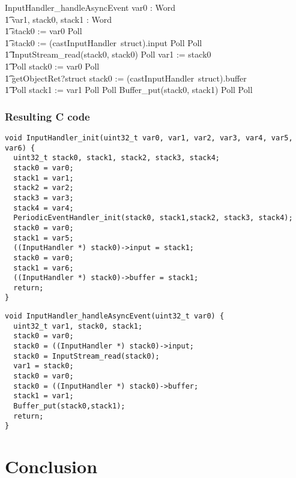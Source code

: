 \documentclass{beamer}
\begin{document}
\begin{frame}[shrink]
\begin{circus}
    InputHandler\_handleAsyncEvent \circdef \circval var0 : Word \circspot \\
    \t1 \circvar var1, stack0, stack1 : Word \circspot \\
    \t1 stack0 := var0 \circseq Poll  \\
    \t1 {\color{red} stack0 := (castInputHandler~struct).input} \circseq Poll \circseq Poll \circseq \\
    \t1 InputStream\_read(stack0, stack0) \circseq Poll \circseq var1 := stack0 \circseq \\
    \t1 Poll \circseq stack0 := var0 \circseq Poll  \\
    \t1 {\color{red} getObjectRet?struct \then stack0 := (castInputHandler~struct).buffer} \circseq \\
    \t1 Poll \circseq stack1 := var1 \circseq Poll \circseq Poll \circseq Buffer\_put(stack0, stack1) \circseq Poll \circseq Poll
  \end{circus}
\end{frame}

\begin{frame}
  \frametitle{Resulting C code}
\begin{lstlisting}
void InputHandler_init(uint32_t var0, var1, var2, var3, var4, var5, var6) {
  uint32_t stack0, stack1, stack2, stack3, stack4;
  stack0 = var0;
  stack1 = var1;
  stack2 = var2;
  stack3 = var3;
  stack4 = var4;
  PeriodicEventHandler_init(stack0, stack1,stack2, stack3, stack4);
  stack0 = var0;
  stack1 = var5;
  ((InputHandler *) stack0)->input = stack1;
  stack0 = var0;
  stack1 = var6;
  ((InputHandler *) stack0)->buffer = stack1;
  return;
}
\end{lstlisting}
\begin{lstlisting}
void InputHandler_handleAsyncEvent(uint32_t var0) {
  uint32_t var1, stack0, stack1;
  stack0 = var0;
  stack0 = ((InputHandler *) stack0)->input;
  stack0 = InputStream_read(stack0);
  var1 = stack0;
  stack0 = var0;
  stack0 = ((InputHandler *) stack0)->buffer;
  stack1 = var1;
  Buffer_put(stack0,stack1);
  return;
}
\end{lstlisting}
\end{frame}


\section{Conclusion}
\end{document}
